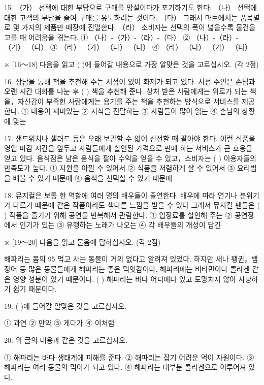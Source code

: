 \documentclass[12pt]{article}
\begin{document}
\begin{enumerate}[1.]
15.
（가） 선택에 대한 부담으로 구매를 망설이다가 포기하기도 한다.
（나） 선택에 대한 고객의 부담을 줄여 구매를 유도하려는 것이다.
（다） 그래서 마트에서는 품목별로 몇 가지의 제품만 매장에 진열한다.
（라） 소비자는 선택의 폭이 넓을수록 물건을 고를 때 어려움을 겪는다.
① （나）-（가）-（라）-（다）	② （나）-（라）-（가）-（다）
③ （라）-（가）-（다）-（나）	④ （라）-（다）-（가）-（나）




※ [16～18] 다음을 읽고 (   )에 들어갈 내용으로 가장 알맞은 것을 고르십시오. (각 2점)

16.
  상담을 통해 책을 추천해 주는 서점이 있어 화제가 되고 있다. 서점
주인은 손님과 오랜 시간 대화를 나눈 후 (     ) 책을 추천해
준다. 상처 받은 사람에게는 위로가 되는 책을，자신감이 부족한 사람에게는
용기를 주는 책을 추천하는 방식으로 서비스를 제공한다.
① 내용이 재미있는	② 지식을 전달하는
③ 사람들이 많이 읽는	④ 손님의 상황에 맞는


17.
  샌드위치나 샐러드 등은 오래 보관할 수 없어 신선할 때 팔아야 한다.
이런 식품을 영업 마감 시간을 앞두고 사람들에게 할인된 가격으로 판매
하는 서비스가 큰 호응을 얻고 있다. 음식점은 남은 음식을 팔아 수익을
얻을 수 있고，소비자는 (     ) 이용자들의 만족도가 높다.
① 자원을 아낄 수 있어서	② 식품을 저렴하게 살 수 있어서
③ 요리법을 배울 수 있기 때문에	④ 음식을 선택할 수 있기 때문에


18.
  뮤지컬은 보통 한 역할에 여러 명의 배우들이 출연한다. 배우에 따라
연기나 분위기가 다르기 때문에 같은 작품이라도 색다른 느낌을 받을 수
있다 그래서 뮤지컬 팬들은 (      ) 작품을 즐기기 위해 공연을
반복해서 관람한다.
① 입장료를 할인해 주는	② 공연장에서 인기가 있는
③ 유행하는 노래가 나오는	④ 각 배우들의 개성이 담긴




※ [19～20] 다음을 읽고 물음에 답하십시오. (각 2점)

  해파리는 몸의 95%
먹고 사는 동물이 거의 없다고 알려져 있었다. 하지만 새나 팽귄，뱀장어
등 많은 동물들에게 해파리는 좋은 먹잇감이다. 해파리에는 비타민이나
콜라겐 같은 영양 성분이 있기 때문이다. (      ) 해파리는 바다 어디에나
있고 도망치지 않아 사냥하기 쉽기 때문이다.


19. (   )에 들어갈 알맞은 것을 고르십시오.

① 과연	② 만약	③ 게다가	④ 이처럼


20. 위 글의 내용과 같은 것을 고르십시오.

① 해파리는 바다 생태계에 피해를 준다.
② 해파리는 잡기 어려운 먹이 자원이다.
③ 해파리는 여러 동물의 먹이가 되고 있다.
④ 해파리는 대부분 콜라겐으로 이루어져 있다.





\end{enumerate}
\end{document}
